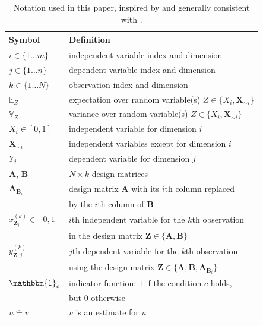 \documentclass[12pt]{article}
\begin{document}
\begin{table}
    \centering
    \begin{tabular}{ll}
        Symbol & Definition \\
        \hline
        $i \in \{1 \ldots m\}$ & independent-variable index and dimension \\
        $j \in \{1 \ldots n\}$ & dependent-variable index and dimension \\
        $k \in \{1 \ldots N\}$ & observation index and dimension \\
        $\mathbb{E}_Z$ & expectation over random variable(s) $Z \in \{ X_i, \mathbf{X}_{\sim i} \}$ \\
        $\mathbb{V}_Z$ & variance over random variable(s) $Z \in \{ X_i, \mathbf{X}_{\sim i} \}$ \\
        $X_i \in [0, 1]$ & independent variable for dimension $i$ \\
        $\mathbf{X}_{\sim i}$ & independent variables except for dimension $i$ \\
        $Y_j$ & dependent variable for dimension $j$ \\
        $\mathbf{A}$, $\mathbf{B}$ & $N \times k$ design matrices \\
        $\mathbf{A}_{\mathbf{B}_i}$ & design matrix $\mathbf{A}$ with its $i$th column replaced \\ & by the $i$th column of $\mathbf{B}$ \\
        $x_{\mathbf{Z}_i}^{(k)} \in [0, 1]$ & $i$th independent variable for the $k$th observation \\ & in the design matrix $\mathbf{Z} \in \{ \mathbf{A}, \mathbf{B} \}$ \\
        $y_{\mathbf{Z},j}^{(k)}$ & $j$th dependent variable for the $k$th observation \\ & using the design matrix $\mathbf{Z} \in \{ \mathbf{A}, \mathbf{B}, \mathbf{A}_{\mathbf{B}_i} \}$ \\
        $\mathbbm{1}_c$ & indicator function: $1$ if the condition $c$ holds, \\ & but $0$ otherwise \\
        $u \mathrel{\hat=} v$ & $v$ is an estimate for $u$ \\
    \end{tabular}
    \caption{Notation used in this paper, inspired by and generally consistent with \citet{saltelli_variance_2010}.}
    \label{tab:notation}
\end{table}
\end{document}
